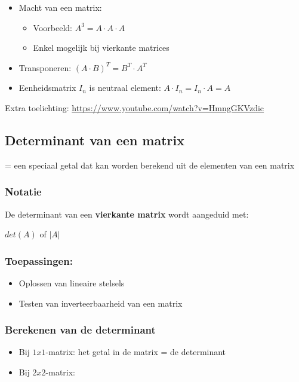 \documentclass{article}
\begin{document}
\begin{itemize}
    \item Macht van een matrix:
    \begin{itemize}
        \item Voorbeeld: $A^3 = A \cdot A \cdot A$
        \item Enkel mogelijk bij vierkante matrices
    \end{itemize}
    \item Transponeren: $(A\cdot B)^T = B^T \cdot A^T$
    \item Eenheidsmatrix $I_n$ is neutraal element: $A \cdot I_n = I_n \cdot A = A$
\end{itemize}

Extra toelichting: \url{https://www.youtube.com/watch?v=HmngGKVzdic}

\subsection{Determinant van een matrix}

= een speciaal getal dat kan worden berekend uit de elementen van een matrix

\subsubsection{Notatie}

De determinant van een \textbf{vierkante matrix} wordt aangeduid met:

$det(A)$ of $|A|$

\subsubsection{Toepassingen:}

\begin{itemize}
    \item Oplossen van lineaire stelsels
    \item Testen van inverteerbaarheid van een matrix
\end{itemize}

\subsubsection{Berekenen van de determinant}

\begin{itemize}
    \item Bij $1x1$-matrix: het getal in de matrix = de determinant
    \item Bij $2x2$-matrix: 
\end{itemize}
\end{document}
